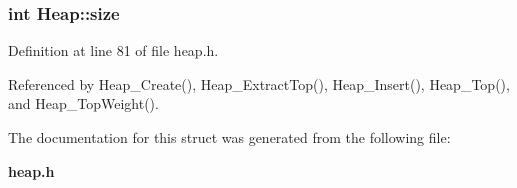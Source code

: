 \subsubsection{\setlength{\rightskip}{0pt plus 5cm}int \bf{Heap::size}}\label{structHeap_c291cf589f86e95198621d33e21a05a6}




Definition at line 81 of file heap.h.

Referenced by Heap\_\-Create(), Heap\_\-Extract\-Top(), Heap\_\-Insert(), Heap\_\-Top(), and Heap\_\-Top\-Weight().

The documentation for this struct was generated from the following file:\begin{CompactItemize}
\item 
\bf{heap.h}\end{CompactItemize}

